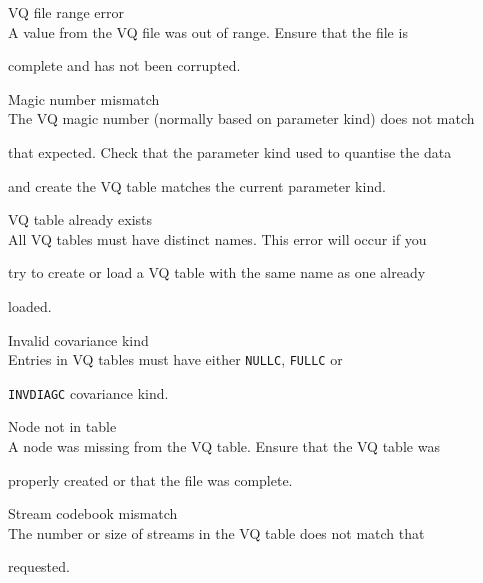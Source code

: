 \begin{itemize}
\begin{itemize}
    VQ file range error\\


        A value from the VQ file was out of range.  Ensure that the file is 


        complete and has not been corrupted.





    Magic number mismatch\\


        The VQ magic number (normally based on parameter kind) does not match


        that expected.  Check that the parameter kind used to quantise the data


        and create the VQ table matches the current parameter kind.





    VQ table already exists\\


        All VQ tables must have distinct names.  This error will occur if you


        try to create or load a VQ table with the same name as one already


        loaded.





    Invalid covariance kind\\


        Entries in VQ tables must have either \texttt{NULLC}, \texttt{FULLC} or


        \texttt{INVDIAGC} covariance kind.





    Node not in table\\


        A node was missing from the VQ table.  Ensure that the VQ table was 


        properly created or that the file was complete.





    Stream codebook mismatch\\


        The number or size of streams in the VQ table does not match that 


        requested.






\end{itemize}
\end{itemize}
